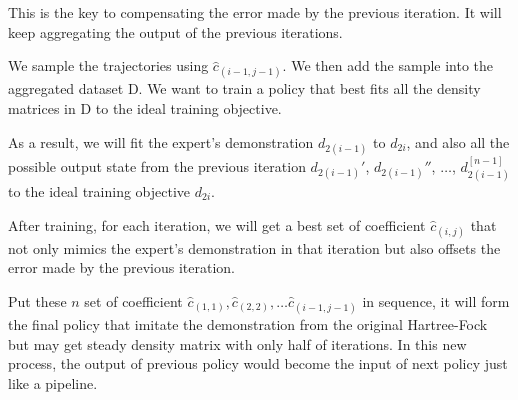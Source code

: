 \documentclass[twoside]{article}
\begin{document}
This is the key to compensating the error made by the previous iteration. It will keep aggregating the output of the previous iterations.






We sample the trajectories using $\hat{c}_{(i-1,j-1)}$. We then add the sample into the aggregated dataset D.
We want to train a policy that best fits all the density matrices in D to the ideal training objective.

As a result, we will fit the expert's demonstration $d_{2(i-1)}$ to $d_{2i}$, and also all the possible output state from the previous iteration $d_{2(i-1)}'$,  $d_{2(i-1)}''$, $\ldots$,  $d_{2(i-1)}^{[n-1]}$  to the ideal training objective $d_{2i}$.

After training, for each iteration, we will get a best set of coefficient $\hat{c}_{(i,j)}$ that not only mimics the expert's demonstration in that iteration but also offsets the error made by the previous iteration.

% 
Put these $n$ set of coefficient $\hat{c}_{(1,1)}, \hat{c}_{(2,2)}, \ldots  \hat{c}_{(i-1,j-1)}$ in sequence, it will form the final policy that imitate the demonstration from the original Hartree-Fock but may get steady density matrix with only half of iterations. In this new process, the output of previous policy would become the input of next policy just like a pipeline. 


\end{document}
